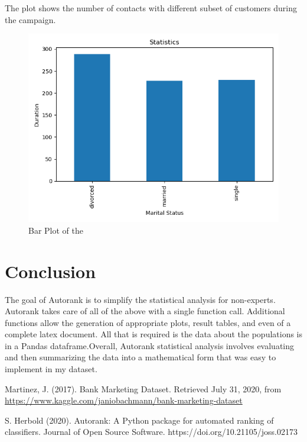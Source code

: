 \documentclass[12pt]{article}
\begin{document}
\newpage
The plot shows the number of contacts with different subset of customers during the campaign.
\begin{figure}[!htbp]
	\centering
	\includegraphics[width=15 cm]{mean.png}
	\caption{Bar Plot of the }
\end{figure}


\section{Conclusion}
The goal of Autorank is to simplify the statistical analysis for non-experts. Autorank takes care of all of the above with a single function call. Additional functions allow the generation of appropriate plots, result tables, and even of a complete latex document. All that is required is the data about the populations is in a Pandas dataframe.Overall, Autorank statistical analysis involves evaluating and then summarizing the data into a mathematical form that was easy to implement in my dataset. 
\newpage

\begin{thebibliography}{999}

	Martinez, J. (2017). Bank Marketing Dataset. Retrieved July 31, 2020, from {\url{https://www.kaggle.com/janiobachmann/bank-marketing-dataset}}

   
	S. Herbold (2020). Autorank: A Python package for automated ranking of classifiers. Journal of Open Source Software. https://doi.org/10.21105/joss.02173


\end{thebibliography}
\end{document}
